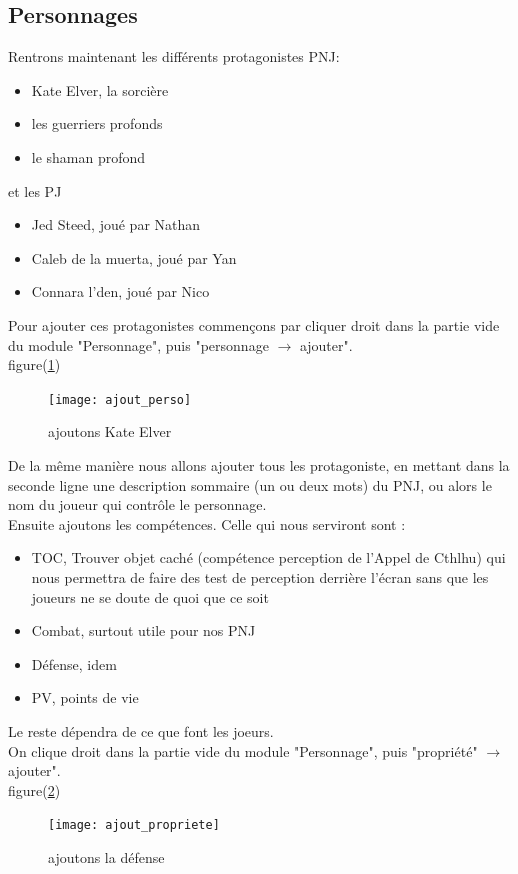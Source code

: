 \documentclass[a4paper,12pt]{article}
\begin{document}
\subsection{Personnages}
Rentrons maintenant les différents protagonistes PNJ:
\begin{itemize}
    \item Kate Elver, la sorcière
    \item les guerriers profonds
    \item le shaman profond
\end{itemize}
et les PJ
\begin{itemize}
    \item Jed Steed, joué par Nathan
    \item Caleb de la muerta, joué par Yan
    \item Connara l'den, joué par Nico
\end{itemize}
Pour ajouter ces protagonistes commençons par cliquer droit dans la partie vide du module "Personnage", puis "personnage $\rightarrow$ ajouter".
\\
figure(\ref{ajout_perso})
\begin{figure}[h!]
    \texttt{[image: ajout\_perso]}
    \caption{ajoutons Kate Elver}
    \label{ajout_perso}
\end{figure}
De la même manière nous allons ajouter tous les protagoniste, en mettant dans la seconde ligne une description sommaire (un ou deux mots) du PNJ, ou alors le nom du joueur qui contrôle le personnage.
\\
Ensuite ajoutons les compétences. Celle qui nous serviront sont :
\begin{itemize}
    \item TOC, Trouver objet caché (compétence perception de l'Appel de Cthlhu) qui nous permettra de faire des test de perception derrière l'écran sans que les joueurs ne se doute de quoi que ce soit
    \item Combat, surtout utile pour nos PNJ
    \item Défense, idem
    \item PV, points de vie
\end{itemize}
Le reste dépendra de ce que font les joeurs.
\\
On clique droit dans la partie vide du module "Personnage", puis "propriété" $\rightarrow$ ajouter".
\\
figure(\ref{ajout_propriete})
\begin{figure}[h!]
    \texttt{[image: ajout\_propriete]}
    \caption{ajoutons la défense}
    \label{ajout_propriete}
\end{figure}
\end{document}
